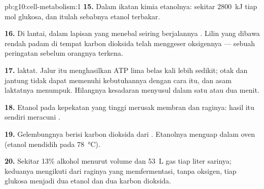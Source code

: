 \begin{solution}{pb:g10:cell-metabolism:1}
\textbf{15.} Dalam ikatan kimia etanolnya: sekitar
\qty{2800}{kJ} tiap mol glukosa, dan itulah sebabnya etanol terbakar.

\textbf{16.} Di lantai, dalam lapisan yang menebal seiring berjalannya
. Lilin yang dibawa rendah padam di tempat karbon dioksida
telah menggeser oksigennya --- sebuah peringatan sebelum orangnya
terkena.

\textbf{17.}  laktat. Jalur itu menghasilkan ATP lima belas
kali lebih sedikit; otak dan jantung tidak dapat memenuhi kebutuhannya
dengan cara itu, dan asam laktatnya menumpuk. Hilangnya kesadaran
menyusul dalam satu atau dua menit.

\textbf{18.} Etanol pada kepekatan yang tinggi merusak membran dan
 raginya: hasil  itu sendiri meracuni .

\textbf{19.} Gelembungnya berisi karbon dioksida dari .
Etanolnya menguap dalam oven (etanol mendidih pada \qty{78}{\celsius}).

\textbf{20.} Sekitar 13\% alkohol menurut volume dan \qty{53}{L} gas
tiap liter sarinya; keduanya mengikuti dari raginya yang
memfermentasi, tanpa oksigen, tiap glukosa menjadi dua etanol dan dua
karbon dioksida.
\end{solution}
